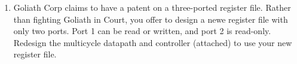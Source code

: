 \documentclass{e85}
\begin{document}
\begin{enumerate}

\item Goliath Corp claims to have a patent on a three-ported register
  file.  Rather than fighting Goliath in Court, you offer to design a
  newe register file with only two ports.  Port 1 can be read or
  written, and port 2 is read-only.  Redesign the multicycle datapath
  and controller (attached) to use your new register file.


\end{enumerate}
\end{document}
